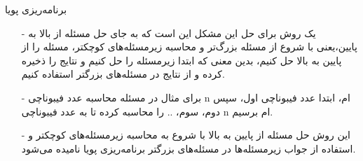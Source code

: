 \begin{frame}{‌برنامه‌ریزی پویا}
\begin{itemize}\itemr
\item[-]
یک روش برای حل این مشکل این است که به جای حل مسئله از بالا به پایین،یعنی با شروع از مسئله بزرگ‌تر و محاسبه زیرمسئله‌های کوچکتر، مسئله را از پایین به بالا حل کنیم، بدین معنی که ابتدا زیرمسئله را حل کنیم و نتایج را ذخیره کرده و از نتایج در مسئله‌های بزرگتر استفاده کنیم.
\item[-]
برای مثال در مسئله محاسبه عدد فیبوناچی n ام، ابتدا عدد فیبوناچی اول، سپس دوم، سوم، .. را محاسبه کرده تا به عدد فیبوناچی n ام برسیم.
\item[-]
این روش حل مسئله از پایین به بالا با شروع به محاسبه زیرمسئله‌های کوچکتر و استفاده از جواب زیرمسئله‌ها در مسئله‌های بزرگتر برنامه‌ریزی پویا نامیده می‌شود.
\end{itemize}
\end{frame}